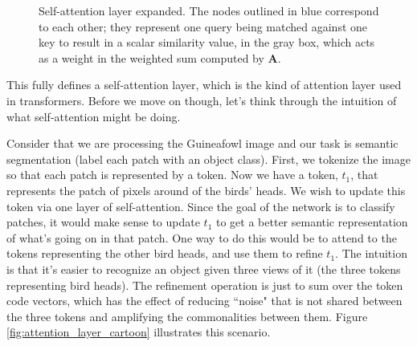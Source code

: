 \begin{figure}[h]
{
}
\caption{Self-attention layer expanded. The nodes outlined in blue correspond to each other; they represent one query being matched against one key to result in a scalar similarity value, in the gray box, which acts as a weight in the weighted sum computed by $\mathbf{A}$.}
\label{fig:transformers:attn_arch}
\end{figure}

This fully defines a self-attention layer, which is the kind of attention layer used in transformers. Before we move on though, let's think through the intuition of what self-attention might be doing.

Consider that we are processing the Guineafowl image and our task is semantic segmentation (label each patch with an object class). First, we tokenize the image so that each patch is represented by a token. Now we have a token, $t_1$, that represents the patch of pixels around of the birds' heads. We wish to update this token via one layer of self-attention. Since the goal of the network is to classify patches, it would make sense to update $t_1$ to get a better semantic representation of what's going on in that patch. One way to do this would be to attend to the tokens representing the other bird heads, and use them to refine $t_1$. The intuition is that it's easier to recognize an object given three views of it (the three tokens representing bird heads). The refinement operation is just to sum over the token code vectors, which has the effect of reducing ``noise" that is not shared between the three tokens and amplifying the commonalities between them. Figure \ref{fig:attention_layer_cartoon} illustrates this scenario.

